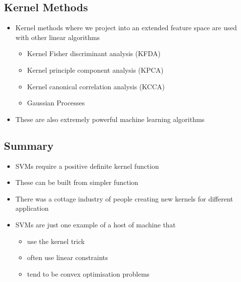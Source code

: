 
\begin{slide}
\section{Kernel Methods}

\begin{PauseHighLight}
  \begin{itemize}
  \item Kernel methods where we project into an extended feature space
    are used with other linear algorithms
    \begin{itemize}
    \item Kernel Fisher discriminant analysis (KFDA)
    \item Kernel principle component analysis (KPCA)
    \item Kernel canonical correlation analysis (KCCA)
    \item Gaussian Processes\pause
    \end{itemize}
  \item These are also extremely powerful machine learning algorithms\pause
  \end{itemize}
\end{PauseHighLight}

\end{slide}



\begin{slide}
\section[-1]{Summary}

\begin{PauseHighLight}
  \begin{itemize}
  \item SVMs require a positive definite kernel function\pause
  \item These can be built from simpler function\pause
  \item There was a cottage industry of people creating new kernels
    for different application\pause
  \item SVMs are just one example of a host of machine that
    \begin{itemize}
    \item use the kernel trick
    \item often use linear constraints
    \item tend to be convex optimisation problems\pause
    \end{itemize}
  \end{itemize}
\end{PauseHighLight}

\end{slide}





